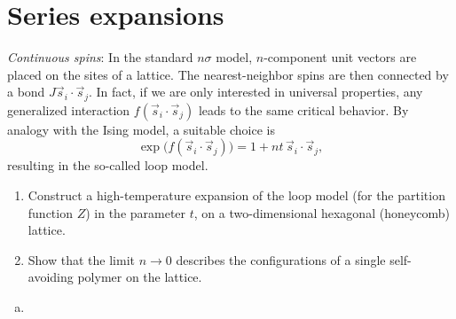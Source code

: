 \chapter{Series expansions}

\begin{problem}
    \textit{Continuous spins}: In the standard $n\sigma$ model, $n$-component unit vectors are placed on the sites of a lattice. The nearest-neighbor spins are then connected by a bond $J\vec{s}_i\cdot\vec{s}_j$. In fact, if we are only interested in universal properties, any generalized interaction $f(\vec{s}_i\cdot\vec{s}_j)$ leads to the same critical behavior. By analogy with the Ising model, a suitable choice is
    \[
        \exp\bigl(f(\vec{s}_i\cdot\vec{s}_j)\bigr) = 1 + nt\,\vec{s}_i\cdot\vec{s}_j,
    \]
    resulting in the so-called loop model.

    \begin{enumerate}
        \item[(a)] Construct a high-temperature expansion of the loop model (for the partition function $Z$) in the parameter $t$, on a two-dimensional hexagonal (honeycomb) lattice.

        \item[(b)] Show that the limit $n \to 0$ describes the configurations of a single self-avoiding polymer on the lattice.
    \end{enumerate}
\end{problem}

\begin{solution}
    \begin{enumerate}[(a)]
        \item
    \end{enumerate}
\end{solution}

